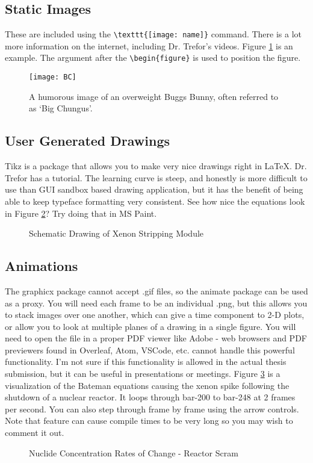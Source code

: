 \newpage

\subsection{Static Images}
These are included using the \verb=\texttt{[image: name]}= command. There is a lot more information on the internet, including Dr. Trefor's videos. Figure \ref{BC} is an example. The argument after the \verb=\begin{figure}= is used to position the figure.

\begin{figure}[h!]
    \centering
    \texttt{[image: BC]}
    \caption[Big Chungus.]{A humorous image of an overweight Buggs Bunny, often referred to as `Big Chungus'.}
    \label{BC}
\end{figure}

\subsection{User Generated Drawings}

Tikz is a package that allows you to make very nice drawings right in \LaTeX \;. Dr. Trefor has a tutorial. The learning curve is steep, and honestly is more difficult to use than GUI sandbox based drawing application, but it has the benefit of being able to keep typeface formatting very consistent. See how nice the equations look in Figure \ref{strip}? Try doing that in MS Paint. 

\begin{figure}[h!]\centering
    
    \caption{Schematic Drawing of Xenon Stripping Module} 
    \label{strip}
\end{figure}

\newpage
\subsection{Animations}
The graphicx package cannot accept .gif files, so the animate package can be used as a proxy. You will need each frame to be an individual .png, but this allows you to stack images over one another, which can give a time component to 2-D plots, or allow you to look at multiple planes of a drawing in a single figure. You will need to open the file in a proper PDF viewer like Adobe - web browsers and PDF previewers found in Overleaf, Atom, VSCode, etc. cannot handle this powerful functionality. I'm not sure if this functionality is allowed in the actual thesis submission, but it can be useful in presentations or meetings. Figure \ref{Bateman} is a visualization of the Bateman equations  causing the xenon spike following the shutdown of a nuclear reactor. It loops through bar-200 to bar-248 at 2 frames per second. You can also step through frame by frame using the arrow controls. Note that feature can cause compile times to be very long so you may wish to comment it out. 

\begin{figure}[h!]
    \centering
    \caption{Nuclide Concentration Rates of Change - Reactor Scram}
    \label{Bateman}
\end{figure}